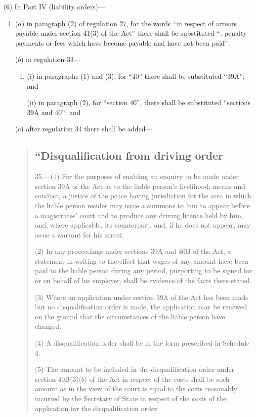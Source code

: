 \documentclass[12pt,a4paper]{article}
\begin{document}
(6) In Part IV (liability orders)—
\begin{enumerate}\item[]
($a$) in paragraph (2) of regulation 27, for the words “in respect of arrears payable under section 41(3) of the Act” there shall be substituted “, penalty payments or fees which have become payable and have not been paid”;

($b$) in regulation 33—
\begin{enumerate}\item[]
(i) in paragraphs (1) and (3), for “40” there shall be substituted “39A”; and

(ii) in paragraph (2), for “section 40”, there shall be substituted “sections 39A and 40”; and
\end{enumerate}

($c$) after regulation 34 there shall be added—
\begin{quotation}
\subsection*{“Disqualification from driving order}

35.---(1)  For the purposes of enabling an enquiry to be made under section 39A of the Act as to the liable person’s livelihood, means and conduct, a justice of the peace having jurisdiction for the area in which the liable person resides may issue a summons to him to appear before a magistrates' court and to produce any driving licence held by him, and, where applicable, its counterpart, and, if he does not appear, may issue a warrant for his arrest.

(2) In any proceedings under sections 39A and 40B of the Act, a statement in writing to the effect that wages of any amount have been paid to the liable person during any period, purporting to be signed for or on behalf of his employer, shall be evidence of the facts there stated.

(3) Where an application under section 39A of the Act has been made but no disqualification order is made, the application may be renewed on the ground that the circumstances of the liable person have changed.

(4) A disqualification order shall be in the form prescribed in Schedule 4.

(5) The amount to be included in the disqualification order under section 40B(3)($b$)  of the Act in respect of the costs shall be such amount as in the view of the court is equal to the costs reasonably incurred by the Secretary of State in respect of the costs of the application for the disqualification order.


\end{quotation}
\end{enumerate}
\end{document}
